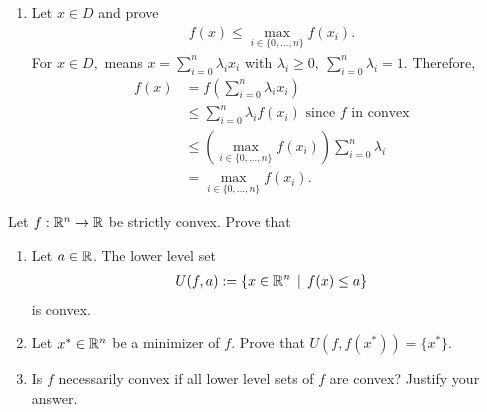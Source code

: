 \documentclass{ExerciseSheet}
\newif\ifsolutions
\begin{document}
\begin{solution}
\begin{enumerate}
    \item Let $x\in D$ and prove 
       \begin{align*}
           f(x)\leq \max_{i\in \{0,\dots,n\}}f(x_i).
       \end{align*}
 For $x\in D,$ means $\displaystyle x=\sum_{i=0}^{n}\lambda_ix_i$ with $\displaystyle \lambda_i\geq 0,~\sum_{i=0}^{n}\lambda_i=1.$ Therefore,
   \begin{align*}
       f(x)&=f\left(\sum_{i=0}^{n}\lambda_ix_i\right)  \\
           &\leq \sum_{i=0}^{n}\lambda_if(x_i)  \text{ since $f$ in convex}\\
           &\leq  \left(\max_{i\in \{0,\dots,n\}}f(x_i)\right)\sum_{i=0}^{n}\lambda_i \\
           &=\max_{i\in \{0,\dots,n\}}f(x_i).
   \end{align*}





       
\end{enumerate}
\end{solution}

\fi

\vskip 0.5cm
\begin{problem}

  
 Let $f:\mathbb{R}^n\rightarrow\mathbb{R}$ be strictly convex. Prove that
 \begin{enumerate}
  \item Let $a\in\mathbb{R}$. The lower level set 
  \begin{align*}
   U(f,a):=\{x \in\mathbb{R}^n\,\mid\,f(x)\leq a\}
  \end{align*}
is convex.
\item Let $x^*\in\mathbb{R}^n$ be a minimizer of $f$. Prove that $U(f,f(x^*))=\{x^*\}$. 
\item Is $f$ necessarily convex if all lower level sets of $f$ are convex? Justify your answer.
 \end{enumerate}
 


\end{problem}

\ifsolutions
\vskip 0.3cm
\end{document}
